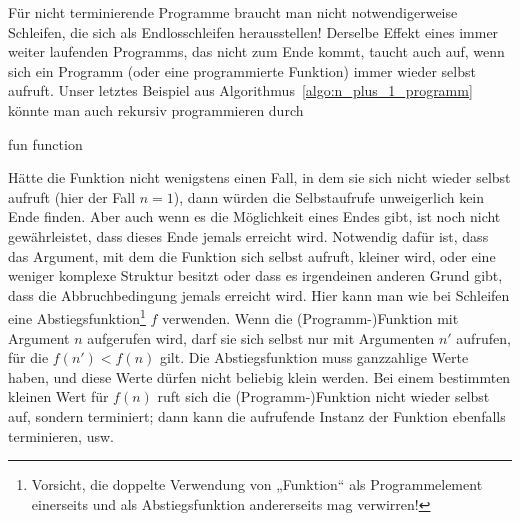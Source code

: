 
Für nicht terminierende Programme braucht man nicht notwendigerweise Schleifen, die sich als Endlosschleifen herausstellen! Derselbe Effekt eines immer weiter laufenden Programms, das nicht zum Ende kommt, taucht auch auf, wenn sich ein Programm (oder eine programmierte Funktion) immer wieder selbst aufruft. Unser letztes Beispiel aus Algorithmus~\ref{algo:n_plus_1_programm} könnte man auch rekursiv programmieren durch

\vspace{\baselineskip}

\begin{algorithm}[H]
	\caption{fun function}
	\label{algo:fun_function}
	
	\vspace{\baselineskip}
	
	
	\vspace{\baselineskip}
	
	
	\vspace{\baselineskip}
	
	
	\vspace{\baselineskip}
\end{algorithm}

\vspace{\baselineskip}

Hätte die Funktion nicht wenigstens einen Fall, in dem sie sich nicht wieder selbst aufruft (hier der Fall $n=1$), dann würden die Selbstaufrufe unweigerlich kein Ende finden. Aber auch wenn es die Möglichkeit eines Endes gibt, ist noch nicht gewährleistet, dass dieses Ende jemals erreicht wird. Notwendig dafür ist, dass das Argument, mit dem die Funktion sich selbst aufruft, kleiner wird, oder eine weniger komplexe Struktur besitzt oder dass es irgendeinen anderen Grund gibt, dass die Abbruch\-bedingung jemals erreicht wird. Hier kann man wie bei Schleifen eine Abstiegsfunktion\footnote{Vorsicht, die doppelte Verwendung von „Funktion“ als Programmelement einerseits und als Abstiegsfunktion andererseits mag verwirren!} $f$ verwenden. Wenn die (Programm-)Funktion mit Argument $n$ aufgerufen wird, darf sie sich selbst nur mit Argumenten $n'$ aufrufen, für die $f(n') < f(n)$ gilt. Die Abstiegsfunktion muss ganzzahlige Werte haben, und diese Werte dürfen nicht beliebig klein werden. Bei einem bestimmten kleinen Wert für $f(n)$ ruft sich die (Programm-)Funktion nicht wieder selbst auf, sondern terminiert; dann kann die aufrufende Instanz der Funktion ebenfalls terminieren, usw.

